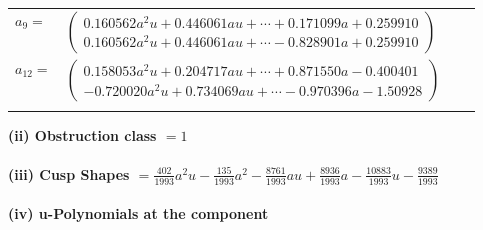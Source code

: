 \documentclass[1p]{elsarticle_modified}
\theoremstyle{definition}
\begin{document}
\begin{tabular}{m{7pt} m{180pt} m{7pt} m{180pt} }
\flushright $a_{9}=$&$\begin{pmatrix}0.160562 a^{2} u+0.446061 a u+\cdots+0.171099 a+0.259910\\0.160562 a^{2} u+0.446061 a u+\cdots-0.828901 a+0.259910\end{pmatrix}$ \\
\flushright $a_{12}=$&$\begin{pmatrix}0.158053 a^{2} u+0.204717 a u+\cdots+0.871550 a-0.400401\\-0.720020 a^{2} u+0.734069 a u+\cdots-0.970396 a-1.50928\end{pmatrix}$\\&\end{tabular}
\flushleft \textbf{(ii) Obstruction class $= 1$}\\~\\
\flushleft \textbf{(iii) Cusp Shapes $= \frac{402}{1993} a^2 u-\frac{135}{1993} a^2-\frac{8761}{1993} a u+\frac{8936}{1993} a-\frac{10883}{1993} u-\frac{9389}{1993}$}\\~\\
\newpage\renewcommand{\arraystretch}{1}
\flushleft \textbf{(iv) u-Polynomials at the component}\newline \\
\end{document}
